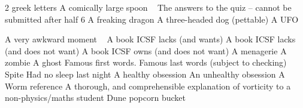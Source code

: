 \begin{multicols}{2}
\begin{small}
\begin{tabbing}
          {2 greek letters}
            {A comically large spoon ~\FD}
           {The answers to the quiz – cannot be submitted after half 6}
           {A freaking dragon}
             {A three-headed dog (pettable)}
        {A UFO}
       
            {A very awkward moment ~\FD}
          {A book ICSF lacks (and wants)}
          {A book ICSF lacks (and does not want)}
           {A book ICSF owns (and does not want)}
       {A menagerie}
       {A zombie}
       {A ghost}
           {Famous first words.}
          {Famous last words (subject to checking)}
          {Spite}
       {Had no sleep last night}
           {A healthy obsession}
           {An unhealthy obsession}
           {A Worm reference}
            {A thorough, and comprehensible explanation of vorticity to a non-physics/maths student}
        {Dune popcorn bucket}

\end{tabbing}
\end{small}
\end{multicols}

